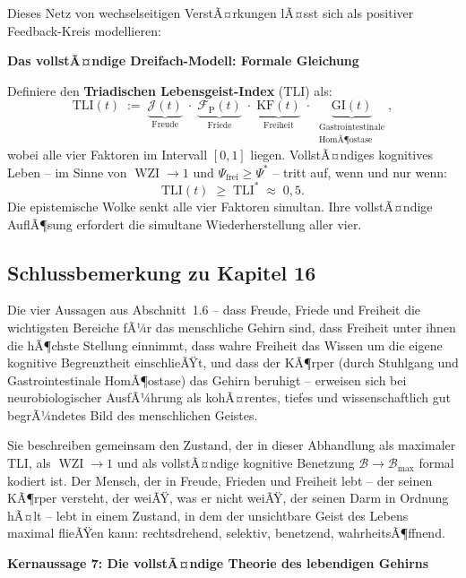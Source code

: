 ﻿\documentclass[12pt,a4paper]{report}
\theoremstyle{plain}
\theoremstyle{definition}
\theoremstyle{remark}
\DeclareMathOperator{\WZI}{WZI}
\begin{document}
	Dieses Netz von wechselseitigen VerstÃ¤rkungen lÃ¤sst sich als
	positiver Feedback-Kreis modellieren:

	
	\noindent\textbf{Das vollstÃ¤ndige Dreifach-Modell: Formale Gleichung}

		Definiere den \textbf{Triadischen Lebensgeist-Index} ($\mathrm{TLI}$) als:
		\[
		\mathrm{TLI}(t)
		\;:=\;
		\underbrace{\mathcal{J}(t)}_{\text{Freude}}
		\;\cdot\;
		\underbrace{\mathcal{F}_\mathrm{P}(t)}_{\text{Friede}}
		\;\cdot\;
		\underbrace{\mathrm{KF}(t)}_{\text{Freiheit}}
		\;\cdot\;
		\underbrace{\mathrm{GI}(t)}_{\substack{\text{Gastrointestinale}\\\text{HomÃ¶ostase}}},
		\]
		wobei alle vier Faktoren im Intervall $[0,1]$ liegen.
		VollstÃ¤ndiges kognitives Leben -- im Sinne von $\WZI \to 1$
		und $\Psi_\mathrm{frei} \geq \Psi^*$ -- tritt auf, wenn und nur wenn:
		\[
		\mathrm{TLI}(t) \;\geq\; \mathrm{TLI}^* \;\approx\; 0{,}5.
		\]
		Die epistemische Wolke senkt alle vier Faktoren simultan.
		Ihre vollstÃ¤ndige AuflÃ¶sung erfordert die simultane
		Wiederherstellung aller vier.


	\subsection{Schlussbemerkung zu Kapitel 16}

	Die vier Aussagen aus Abschnitt~1.6 -- dass Freude, Friede und Freiheit
	die wichtigsten Bereiche fÃ¼r das menschliche Gehirn sind,
	dass Freiheit unter ihnen die hÃ¶chste Stellung einnimmt,
	dass wahre Freiheit das Wissen um die eigene kognitive Begrenztheit
	einschlieÃŸt, und dass der KÃ¶rper (durch Stuhlgang und
	Gastrointestinale HomÃ¶ostase) das Gehirn beruhigt --
	erweisen sich bei neurobiologischer AusfÃ¼hrung als
	kohÃ¤rentes, tiefes und wissenschaftlich gut begrÃ¼ndetes Bild
	des menschlichen Geistes.

	Sie beschreiben gemeinsam den Zustand, der in dieser Abhandlung
	als maximaler $\mathrm{TLI}$, als $\WZI \to 1$ und als vollstÃ¤ndige
	kognitive Benetzung $\mathcal{B} \to \mathcal{B}_{\max}$ formal kodiert ist.
	Der Mensch, der in Freude, Frieden und Freiheit lebt --
	der seinen KÃ¶rper versteht, der weiÃŸ, was er nicht weiÃŸ,
	der seinen Darm in Ordnung hÃ¤lt -- lebt in einem Zustand,
	in dem der unsichtbare Geist des Lebens maximal flieÃŸen kann:
	rechtsdrehend, selektiv, benetzend, wahrheitsÃ¶ffnend.

	
	\noindent\textbf{Kernaussage 7: Die vollstÃ¤ndige Theorie des lebendigen Gehirns}
\end{document}

